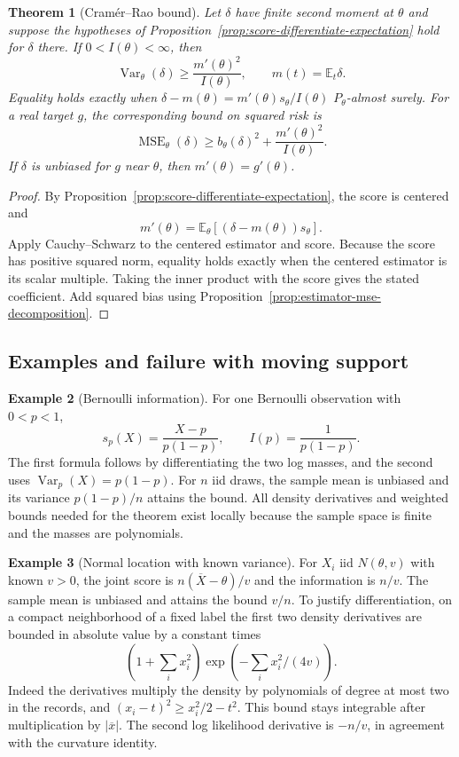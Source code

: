 \documentclass[11pt,oneside]{book}
\newtheorem{theorem}{Theorem}[chapter]
\theoremstyle{definition}
\newtheorem{example}[theorem]{Example}
\theoremstyle{remark}
\begin{document}
\begin{theorem}[Cram\'er--Rao bound]
\label{thm:scalar-cramer-rao}
Let $\delta$ have finite second moment at $\theta$ and suppose the
hypotheses of Proposition~\ref{prop:score-differentiate-expectation}
hold for $\delta$ there. If $0<I(\theta)<\infty$, then
\[
\operatorname{Var}_\theta(\delta)\geq\frac{m'(\theta)^2}{I(\theta)},
\qquad m(t)=\mathbb E_t\delta .
\]
Equality holds exactly when
$\delta-m(\theta)=m'(\theta)s_\theta/I(\theta)$ $P_\theta$-almost surely.
For a real target $g$, the corresponding bound on squared risk is
\[
\operatorname{MSE}_\theta(\delta)
\geq b_\theta(\delta)^2+\frac{m'(\theta)^2}{I(\theta)} .
\]
If $\delta$ is unbiased for $g$ near $\theta$, then $m'(\theta)=g'(\theta)$.
\end{theorem}
\begin{proof}
By Proposition~\ref{prop:score-differentiate-expectation},
the score is centered and
\[
m'(\theta)=\mathbb E_\theta[(\delta-m(\theta))s_\theta].
\]
Apply Cauchy--Schwarz to the centered estimator and score.
Because the score has positive squared norm, equality holds
exactly when the centered estimator is its scalar multiple.
Taking the inner product with the score gives the stated
coefficient. Add squared bias using
Proposition~\ref{prop:estimator-mse-decomposition}.
\end{proof}

\subsection{Examples and failure with moving support}
\label{subsec:fisher-examples}

\begin{example}[Bernoulli information]
\label{ex:fisher-bernoulli}
For one Bernoulli observation with $0<p<1$,
\[
s_p(X)=\frac{X-p}{p(1-p)},\qquad I(p)=\frac1{p(1-p)} .
\]
The first formula follows by differentiating the two log masses,
and the second uses $\operatorname{Var}_p(X)=p(1-p)$.
For $n$ iid draws, the sample mean is unbiased and its variance
$p(1-p)/n$ attains the bound. All density derivatives and
weighted bounds needed for the theorem exist locally because
the sample space is finite and the masses are polynomials.
\end{example}

\begin{example}[Normal location with known variance]
\label{ex:fisher-normal-location}
For $X_i$ iid $N(\theta,v)$ with known $v>0$, the joint score is
$n(\overline X-\theta)/v$ and the information is $n/v$.
The sample mean is unbiased and attains the bound $v/n$.
To justify differentiation, on a compact neighborhood of a
fixed label the first two density derivatives are bounded in
absolute value by a constant times
\[
(1+\textstyle\sum_i x_i^2)\exp(-\textstyle\sum_i x_i^2/(4v)).
\]
Indeed the derivatives multiply the density by polynomials of
degree at most two in the records, and
$(x_i-t)^2\geq x_i^2/2-t^2$. This bound stays integrable after
multiplication by $|\overline x|$. The second log likelihood
derivative is $-n/v$, in agreement with the curvature identity.
\end{example}
\end{document}
